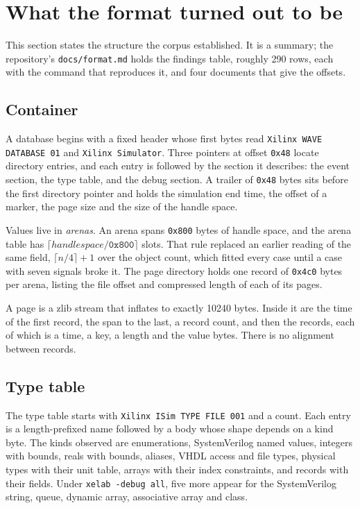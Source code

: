 \section{What the format turned out to be}
\label{sec:format}

This section states the structure the corpus established. It is a
summary; the repository's \texttt{docs/format.md} holds the findings
table, roughly 290 rows, each with the command that reproduces it, and
four documents that give the offsets.

\subsection{Container}

A database begins with a fixed header whose first bytes read
\texttt{Xilinx WAVE DATABASE 01} and \texttt{Xilinx Simulator}. Three
pointers at offset \texttt{0x48} locate directory entries, and each
entry is followed by the section it describes: the event section, the
type table, and the debug section. A trailer of \texttt{0x48} bytes
sits before the first directory pointer and holds the simulation end
time, the offset of a marker, the page size and the size of the handle
space.

Values live in \emph{arenas}. An arena spans \texttt{0x800} bytes of
handle space, and the arena table has
$\lceil \mathit{handlespace} / \texttt{0x800} \rceil$ slots. That rule
replaced an earlier reading of the same field, $\lceil n/4 \rceil + 1$
over the object count, which fitted every case until a case with seven
signals broke it. The page directory holds one record of \texttt{0x4c0}
bytes per arena, listing the file offset and compressed length of each
of its pages.

A page is a zlib stream that inflates to exactly 10240 bytes. Inside
it are the time of the first record, the span to the last, a record
count, and then the records, each of which is a time, a key, a length
and the value bytes. There is no alignment between records.

\subsection{Type table}

The type table starts with \texttt{Xilinx ISim TYPE FILE 001} and a
count. Each entry is a length-prefixed name followed by a body whose
shape depends on a kind byte. The kinds observed are enumerations,
SystemVerilog named values, integers with bounds, reals with bounds,
aliases, VHDL access and file types, physical types with their unit
table, arrays with their index constraints, and records with their
fields. Under \texttt{xelab -debug all}, five more appear for the
SystemVerilog string, queue, dynamic array, associative array and
class.

